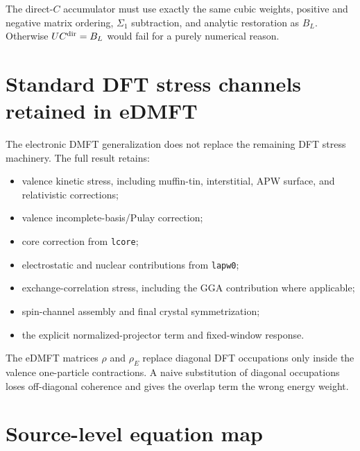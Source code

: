 \documentclass[11pt]{article}
\numberwithin{equation}{section}
\newcommand{\code}[1]{\texttt{#1}}
\begin{document}
The direct-$C$ accumulator must use exactly the same cubic weights, positive
and negative matrix ordering, $\Sigma_1$ subtraction, and analytic restoration
as $B_L$.  Otherwise $UC^{\rm dir}=B_L$ would fail for a purely numerical
reason.

\section{Standard DFT stress channels retained in eDMFT}

The electronic DMFT generalization does not replace the remaining DFT stress
machinery.  The full result retains:

\begin{itemize}
\item valence kinetic stress, including muffin-tin, interstitial, APW surface,
      and relativistic corrections;
\item valence incomplete-basis/Pulay correction;
\item core correction from \code{lcore};
\item electrostatic and nuclear contributions from \code{lapw0};
\item exchange-correlation stress, including the GGA contribution where
      applicable;
\item spin-channel assembly and final crystal symmetrization;
\item the explicit normalized-projector term and fixed-window response.
\end{itemize}

The eDMFT matrices $\rho$ and $\rho_E$ replace diagonal DFT occupations only
inside the valence one-particle contractions.  A naive substitution of
diagonal occupations loses off-diagonal coherence and gives the overlap term
the wrong energy weight.

\section{Source-level equation map}
\end{document}
